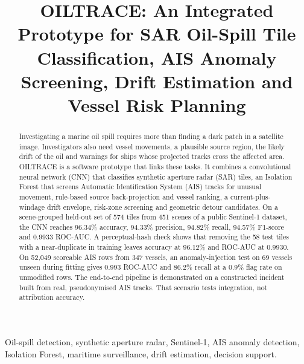 \documentclass[conference]{IEEEtran}
\begin{document}
\title{OILTRACE: An Integrated Prototype for SAR Oil-Spill Tile Classification, AIS Anomaly Screening, Drift Estimation and Vessel Risk Planning}

\author{\IEEEauthorblockN{[Author 1], [Author 2], [Author 3], [Author 4], [Author 5], [Author 6]}
}

\maketitle

\begin{abstract}
Investigating a marine oil spill requires more than finding a dark patch in a
satellite image. Investigators also need vessel movements, a plausible source
region, the likely drift of the oil and warnings for ships whose projected tracks
cross the affected area. OILTRACE is a software prototype that links these tasks.
It combines a convolutional neural network (CNN) that classifies synthetic aperture
radar (SAR) tiles, an Isolation Forest that screens Automatic Identification System
(AIS) tracks for unusual movement, rule-based source back-projection and vessel
ranking, a current-plus-windage drift envelope, risk-zone screening and geometric
detour candidates. On a scene-grouped held-out set of 574 tiles from 451 scenes of
a public Sentinel-1 dataset, the CNN reaches 96.34\% accuracy, 94.33\% precision,
94.82\% recall, 94.57\% F1-score and 0.9933 ROC-AUC. A perceptual-hash check shows
that removing the 58 test tiles with a near-duplicate in training leaves accuracy at
96.12\% and ROC-AUC at 0.9930. On 52,049 scoreable AIS rows from 347 vessels, an
anomaly-injection test on 69 vessels unseen during fitting gives 0.993 ROC-AUC and
86.2\% recall at a 0.9\% flag rate on unmodified rows. The end-to-end pipeline is
demonstrated on a constructed incident built from real, pseudonymised AIS tracks.
That scenario tests integration, not attribution accuracy.
\end{abstract}

\begin{IEEEkeywords}
Oil-spill detection, synthetic aperture radar, Sentinel-1, AIS anomaly detection,
Isolation Forest, maritime surveillance, drift estimation, decision support.
\end{IEEEkeywords}
\end{document}

